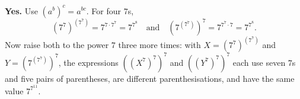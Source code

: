\textbf{Yes.} Use $\left(a^b\right)^c=a^{bc}$. For four $7$s,
\[\left(7^7\right)^{\left(7^7\right)}=7^{7\cdot7^7}=7^{7^8}\quad\text{and}\quad\left(7^{\left(7^7\right)}\right)^7=7^{7^7\cdot7}=7^{7^8}.\]
Now raise both to the power $7$ three more times: with $X=\left(7^7\right)^{\left(7^7\right)}$ and $Y=\left(7^{\left(7^7\right)}\right)^7$, the expressions $\left(\left(X^7\right)^7\right)^7$ and $\left(\left(Y^7\right)^7\right)^7$ each use seven $7$s and five pairs of parentheses, are different parenthesisations, and have the same value $7^{7^{11}}$.
